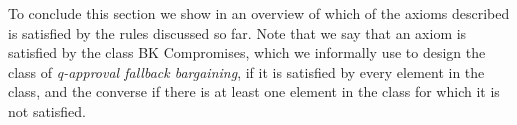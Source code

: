 
To conclude this section we show in  an overview of which of the axioms described is satisfied by the rules discussed so far. Note that we say that an axiom is satisfied by the class \acs{BK} Compromises, which we informally use to design the class of \textit{q-approval fallback bargaining}, if it is satisfied by every element in the class, and the converse if there is at least one element in the class for which it is not satisfied.

\begin{table}[h]
\caption{Axioms satisfied by the voting rules described.}
\label{tab:overview}
\end{table}


